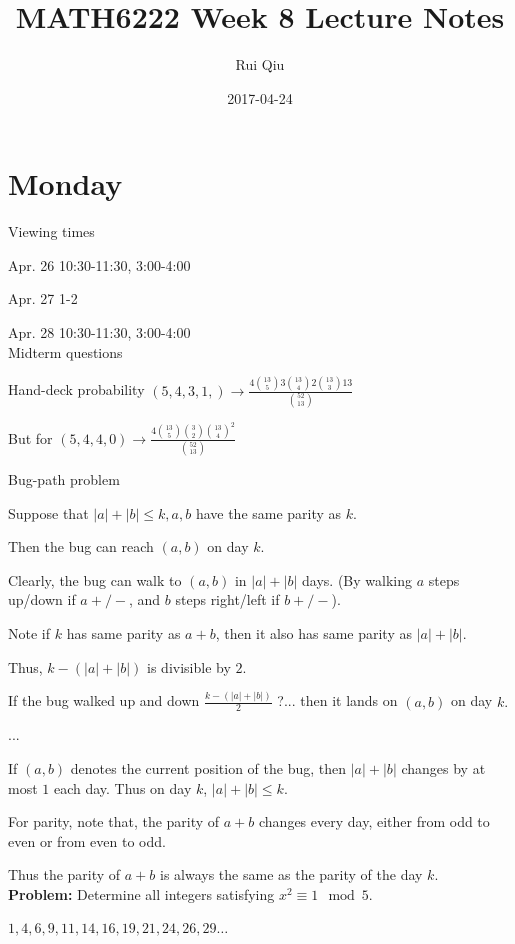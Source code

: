 \documentclass[a4paper, 11pt, twoside]{article}
\begin{document}
\title{MATH6222 Week 8 Lecture Notes}
\author{Rui Qiu}
\date{2017-04-24}

\maketitle

\section{Monday}

Viewing times

Apr. 26 10:30-11:30, 3:00-4:00

Apr. 27 1-2

Apr. 28 10:30-11:30, 3:00-4:00\\

Midterm questions

Hand-deck probability $(5,4,3,1,)\rightarrow\frac{4{13\choose 5}3{13\choose 4}2{13\choose 3}13}{{52\choose 13}}$

But for $(5,4,4,0)\rightarrow\frac{4{13\choose 5}{3\choose 2}{13\choose 4}^2}{{52 \choose 13}}$

Bug-path problem

Suppose that $|a|+|b|\leq k, a, b$ have the same parity as $k$.

Then the bug can reach $(a,b)$ on day $k$.

Clearly, the bug can walk to $(a,b)$ in $|a|+|b|$ days. (By walking $a$ steps up/down if $a +/-$, and $b$ steps right/left if $b +/-$).

Note if $k$ has same parity as $a+b$, then it also has same parity as $|a|+|b|$.

Thus, $k-(|a|+|b|)$ is divisible by $2$.

If the bug walked up and down $\frac{k-(|a|+|b|)}{2}$ ?... then it lands on $(a,b)$ on day $k.$

...

If $(a,b)$ denotes the current position of the bug, then $|a|+|b|$ changes by at most $1$ each day. Thus on day $k$, $|a|+|b|\leq k$.

For parity, note that, the parity of $a+b$ changes every day, either from odd to even or from even to odd.

Thus the parity of $a+b$ is always the same as the parity of the day $k$.\\

\textbf{Problem:} Determine all integers satisfying $x^2\equiv 1\mod 5$.

$1,4,6,9,11,14,16,19,21,24,26,29\dots$
\end{document}
